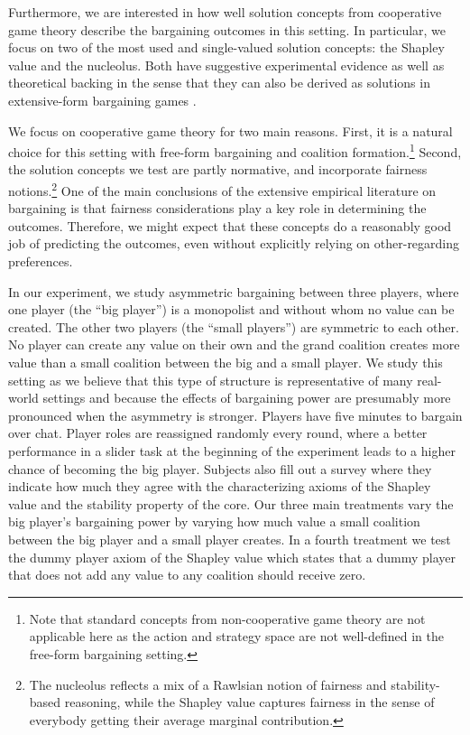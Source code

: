 \documentclass[12pt]{article}
\begin{document}
Furthermore, we are interested in how well solution concepts from cooperative game theory describe the bargaining outcomes in this setting. In particular, we focus on two of the most used and single-valued solution concepts: the Shapley value and the nucleolus. Both have suggestive experimental evidence \parencite{MurnighanRoth1977, MichenerPotter1981, ClippelRozen2022, KomoritaHamiltonKravitz1984, LeopoldWildburger1992} as well as theoretical backing in the sense that they can also be derived as solutions in extensive-form bargaining games \parencite{gul1989bargaining,hart1996bargaining,stole1996organizational}.

We focus on cooperative game theory for two main reasons. First, it is a natural choice for this setting with free-form bargaining and coalition formation.\footnote{Note that standard concepts from non-cooperative game theory are not applicable here as the action and strategy space are not well-defined in the free-form bargaining setting.} Second, the solution concepts we test are partly normative, and incorporate fairness notions.\footnote{The nucleolus reflects a mix of a Rawlsian notion of fairness and stability-based reasoning, while the Shapley value captures fairness in the sense of everybody getting their average marginal contribution.} One of the main conclusions of the extensive empirical literature on bargaining is that fairness considerations play a key role in determining the outcomes. Therefore, we might expect that these concepts do a reasonably good job of predicting the outcomes, even without explicitly relying on other-regarding preferences.

In our experiment, we study asymmetric bargaining between three players, where one player (the ``big player'') is a monopolist and without whom no value can be created. The other two players (the ``small players'') are symmetric to each other. No player can create any value on their own and the grand coalition creates more value than a small coalition between the big and a small player. We study this setting as we believe that this type of structure is representative of many real-world settings and because the effects of bargaining power are presumably more pronounced when the asymmetry is stronger. Players have five minutes to bargain over chat. Player roles are reassigned randomly every round, where a better performance in a slider task at the beginning of the experiment leads to a higher chance of becoming the big player. Subjects also fill out a survey where they indicate how much they agree with the characterizing axioms of the Shapley value and the stability property of the core. Our three main treatments vary the big player's bargaining power by varying how much value a small coalition between the big player and a small player creates. In a fourth treatment we test the dummy player axiom of the Shapley value which states that a dummy player that does not add any value to any coalition should receive zero.
\end{document}
